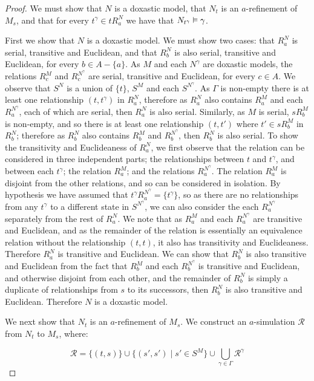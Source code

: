 \begin{proof}
We must show that $N$ is a doxastic model, that $N_t$ is an $a$-refinement of
$M_s$, and that for every $t^\gamma \in tR^N_a$ we have that $N_{t^\gamma}
\vDash \gamma$. 

First we show that $N$ is a doxastic model. We must show two cases: that $R^N_a$
is serial, transitive and Euclidean, and that $R^N_b$ is also serial, transitive
and Euclidean, for every $b \in A - \{a\}$. As $M$ and each $N^\gamma$ are doxastic
models, the relations $R^M_c$ and $R^{N^\gamma}_c$ are serial, transitive and
Euclidean, for every $c \in A$. We observe that $S^N$ is a union of $\{t\}$,
$S^M$ and each $S^{N^\gamma}$. As $\Gamma$ is non-empty there is at
least one relationship $(t, t^\gamma)$ in $R^N_a$, therefore as $R^N_a$ also
contains $R^M_a$ and each $R^{N^\gamma}_a$, each of which are serial, then $R^N_a$
is also serial. Similarly, as $M$ is serial, $sR^M_b$ is non-empty, and so there
is at least one relationship $(t, t')$ where $t' \in sR^M_b$ in $R^N_b$;
therefore as $R^N_b$ also contains $R^M_b$ and $R^{N^\gamma}_b$, then $R^N_b$ is
also serial. To show the transitivity and Euclideaness of $R^N_a$, we first
observe that the relation can be considered in three independent parts; the
relationships between $t$ and $t^\gamma$, and between each $t^\gamma$; the
relation $R^M_a$; and the relations $R^{N^\gamma}_a$. The relation $R^M_a$ is
disjoint from the other relations, and so can be considered in isolation. By
hypothesis we have assumed that $t^\gamma R^{N^\gamma}_a = \{t^\gamma\}$, so as
there are no relationships from any $t^\gamma$ to a different state in
$S^{N^\gamma}$, we can also consider the each $R^{N^\gamma}_a$ separately from
the rest of $R^N_a$. We note that as $R^M_a$ and each $R^{N^\gamma}_a$ are
transitive and Euclidean, and as the remainder of the relation is essentially an
equivalence relation without the relationship $(t, t)$, it also has transitivity
and Euclideaness. Therefore $R^N_a$ is transitive and Euclidean. We can show
that $R^N_b$ is also transitive and Euclidean from the fact that $R^M_b$ and
each $R^{N^\gamma}_b$ is transitive and Euclidean, and otherwise disjoint from
each other, and the remainder of $R^N_b$ is simply a duplicate of relationships
from $s$ to its successors, then $R^N_b$ is also transitive and Euclidean.
Therefore $N$ is a doxastic model.

We next show that $N_t$ is an $a$-refinement of $M_s$. We construct an
$a$-simulation $\mathcal{R}$ from $N_t$ to $M_s$, where:

$$\mathcal{R} = \{(t, s)\} \cup \{(s', s') \mid s' \in S^M \} 
\cup \bigcup_{\gamma \in \Gamma} \mathcal{R}^\gamma$$


\end{proof}
